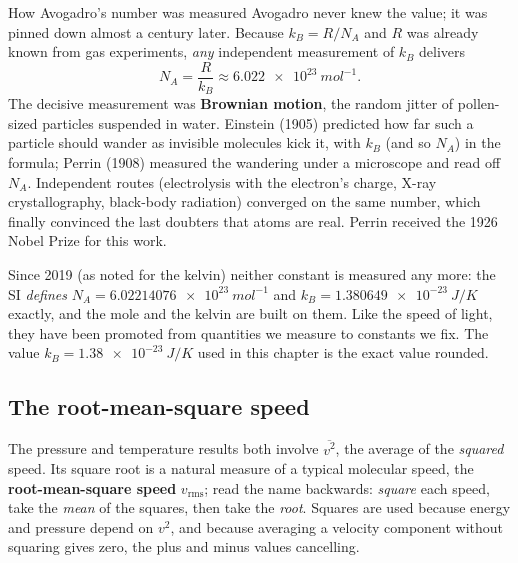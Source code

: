 
\begin{remarkbox}{How Avogadro's number was measured}
Avogadro never knew the value; it was pinned down almost a century later. Because $k_B = R/N_A$ and $R$
was already known from gas experiments, \emph{any} independent measurement of $k_B$ delivers
\[
N_A = \frac{R}{k_B} \approx \SI{6.022e23}{mol^{-1}}.
\]
The decisive measurement was \textbf{Brownian motion}, the random jitter of pollen-sized particles
suspended in water. Einstein (1905) predicted how far such a particle should wander as invisible
molecules kick it, with $k_B$ (and so $N_A$) in the formula; Perrin (1908) measured the wandering under a
microscope and read off $N_A$. Independent routes (electrolysis with the electron's charge, X-ray
crystallography, black-body radiation) converged on the same number, which finally convinced the last
doubters that atoms are real. Perrin received the 1926 Nobel Prize for this work.

Since 2019 (as  noted for the kelvin) neither constant is measured any more: the SI \emph{defines}
$N_A=\SI{6.02214076e23}{mol^{-1}}$ and $k_B=\SI{1.380649e-23}{J/K}$ exactly, and the mole and the kelvin
are built on them. Like the speed of light, they have been promoted from quantities we measure to
constants we fix. The value $k_B=\SI{1.38e-23}{J/K}$ used in this chapter is the exact value rounded.
\end{remarkbox}

\subsection{The root-mean-square speed}

The pressure and temperature results both involve $\overline{v^2}$, the average of the \emph{squared}
speed. Its square root is a natural measure of a typical molecular speed, the \textbf{root-mean-square
speed} $v_{\text{rms}}$; read the name backwards: \emph{square} each speed, take the \emph{mean} of the
squares, then take the \emph{root}. Squares are used because energy and pressure depend on $v^2$, and
because averaging a velocity component without squaring gives zero, the plus and minus values cancelling.

